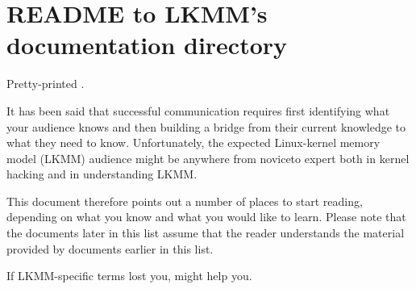 \chapter{README to LKMM's documentation directory}

\begin{Note}
  Pretty-printed .
\end{Note}

It has been said that successful communication requires first identifying
what your audience knows and then building a bridge from their current
knowledge to what they need to know.
Unfortunately, the expected Linux-kernel memory model (LKMM) audience
might be anywhere from noviceto expert both in kernel hacking and in
understanding LKMM.

This document therefore points out a number of places to start reading,
depending on what you know and what you would like to learn.
Please note that the documents later in this list assume that the reader
understands the material provided by documents earlier in this list.

If LKMM-specific terms lost you,  might help you.

